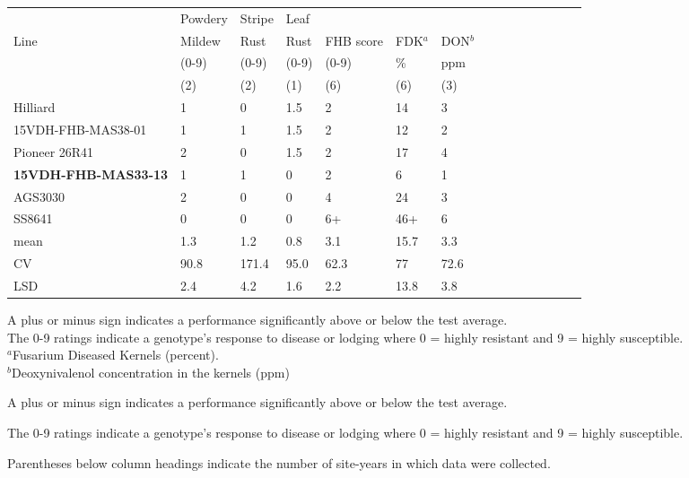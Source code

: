 \documentclass[12pt, letterpaper]{article}
\begin{document}
\begin{landscape}
\begin{table}[ht]
\begin{tabular}{lllllllllllllll}
  \hline
     & Powdery & Stripe & Leaf  &       &     &     \\
Line & Mildew  & Rust   & Rust  & FHB score  & FDK$^a$ & DON$^b$ \\
     & (0-9)   & (0-9)  & (0-9) & (0-9) & \%  & ppm \\
     & (2)     & (2)    & (1)   & (6)   & (6) & (3) \\
  \hline
  Hilliard           & 1    & 0     & 1.5  & 2    & 14   & 3    \\ 
  15VDH-FHB-MAS38-01 & 1    & 1     & 1.5  & 2    & 12   & 2    \\ 
  Pioneer 26R41      & 2    & 0     & 1.5  & 2    & 17   & 4    \\ 
  \textbf{15VDH-FHB-MAS33-13} & 1    & 1     & 0    & 2    & 6    & 1    \\ 
  AGS3030            & 2    & 0     & 0    & 4    & 24   & 3    \\ 
  SS8641             & 0    & 0     & 0    & 6+   & 46+  & 6    \\ 
  mean               & 1.3  & 1.2   & 0.8  & 3.1  & 15.7 & 3.3  \\ 
  CV                 & 90.8 & 171.4 & 95.0 & 62.3 & 77   & 72.6 \\ 
  LSD                & 2.4  & 4.2   & 1.6  & 2.2  & 13.8 & 3.8  \\
   \hline
\end{tabular}

\raggedright{
\footnotesize
A plus or minus sign indicates a performance significantly above or below the test average.\\
The 0-9 ratings indicate a genotype's response to disease or lodging where 0 = highly resistant and 9 = highly susceptible.\\
$^a$Fusarium Diseased Kernels (percent). \\
$^b$Deoxynivalenol concentration in the kernels (ppm)}

\end{table}


\clearpage 


\footnotesize
\begin{ThreePartTable}
\begin{TableNotes}
\footnotesize
\item A plus or minus sign indicates a performance significantly above or below the test average.
\item The 0-9 ratings indicate a genotype's response to disease or lodging where 0 = highly resistant and 9 = highly susceptible.
\item Parentheses below column headings indicate the number of site-years in which data were collected.
\end{TableNotes}


\end{ThreePartTable}
\end{landscape}
\end{document}
